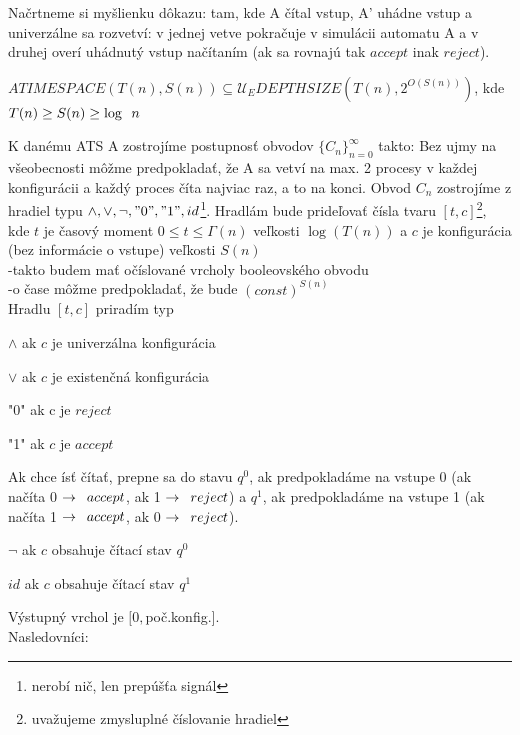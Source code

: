 \begin{dokaz}
Načrtneme si myšlienku dôkazu: tam, kde A čítal vstup, A' uhádne vstup a univerzálne sa
rozvetví: v jednej vetve pokračuje v simulácii automatu A a v druhej overí uhádnutý vstup
načítaním (ak sa rovnajú tak $accept$ inak $reject$).
\end{dokaz}

\begin{veta}\label{Veta4}
$ATIMESPACE(T(n),S(n))\subseteq \mathcal{U}_E DEPTHSIZE(T(n),2^{O(S(n))})$, kde $T(n)\geq
S(n) \geq \log\enspace n$
\end{veta}

\begin{dokaz}
K danému ATS A zostrojíme postupnosť obvodov $\{C_n\}_{n=0}^{\infty}$ takto: Bez ujmy na
všeobecnosti môžme predpokladať, že A sa vetví na max. 2 procesy v každej konfigurácii a
každý proces číta najviac raz, a to na konci. Obvod $C_n$ zostrojíme z hradiel typu
$\wedge,\vee,\neg, "0","1",id$\footnote{nerobí nič, len prepúšťa signál}. Hradlám bude
prideľovať čísla tvaru $[t,c]$\footnote{uvažujeme zmysluplné číslovanie hradiel}, kde $t$
je časový moment $0\leq t \leq \Gamma(n)$ veľkosti $\log(T(n))$ a $c$ je konfigurácia
(bez informácie o vstupe) veľkosti $S(n)$\\ -takto budem mať očíslované vrcholy
booleovského obvodu \\ -o čase môžme predpokladať, že bude $(const)^{S(n)}$\\Hradlu
$[t,c]$ priradím typ
\begin{description}
\item {$\wedge$ } ak $c$ je univerzálna konfigurácia
\item {$\vee$ } ak $c$ je existenčná konfigurácia
\item {"0"} ak c je $reject$
\item {"1"} ak $c$ je $accept$
\end{description}
Ak chce ísť čítať, prepne sa do stavu $q^0$, ak predpokladáme na vstupe 0 (ak načíta 0
$\rightarrow \enspace accept$, ak 1 $\rightarrow \enspace reject$) a $q^1$, ak predpokladáme na
vstupe 1 (ak načíta 1 $\rightarrow \enspace accept$, ak 0 $\rightarrow \enspace reject$).
\begin{description}
\item $\neg $ ak $c$ obsahuje čítací stav $q^0$
\item $id $ ak $c$ obsahuje čítací stav $q^1$
\end{description}
Výstupný vrchol je $[0,$poč.konfig.$]$.\\ Nasledovníci:

\end{dokaz}

